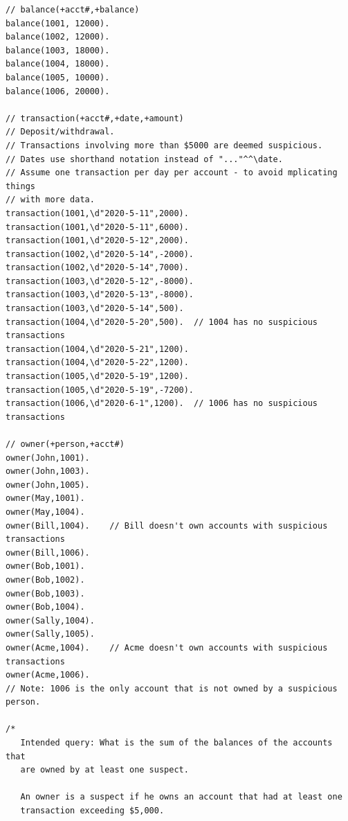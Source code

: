 \documentclass[11pt]{article}
\begin{document}
\begin{verbatim}
// balance(+acct#,+balance)
balance(1001, 12000).
balance(1002, 12000).
balance(1003, 18000).
balance(1004, 18000).
balance(1005, 10000).
balance(1006, 20000).

// transaction(+acct#,+date,+amount)
// Deposit/withdrawal.
// Transactions involving more than $5000 are deemed suspicious.
// Dates use shorthand notation instead of "..."^^\date.
// Assume one transaction per day per account - to avoid mplicating things
// with more data.
transaction(1001,\d"2020-5-11",2000).
transaction(1001,\d"2020-5-11",6000).
transaction(1001,\d"2020-5-12",2000).
transaction(1002,\d"2020-5-14",-2000).
transaction(1002,\d"2020-5-14",7000).
transaction(1003,\d"2020-5-12",-8000).
transaction(1003,\d"2020-5-13",-8000).
transaction(1003,\d"2020-5-14",500).
transaction(1004,\d"2020-5-20",500).  // 1004 has no suspicious transactions
transaction(1004,\d"2020-5-21",1200).
transaction(1004,\d"2020-5-22",1200).
transaction(1005,\d"2020-5-19",1200).
transaction(1005,\d"2020-5-19",-7200).
transaction(1006,\d"2020-6-1",1200).  // 1006 has no suspicious transactions

// owner(+person,+acct#)
owner(John,1001).
owner(John,1003).
owner(John,1005).
owner(May,1001).
owner(May,1004).
owner(Bill,1004).    // Bill doesn't own accounts with suspicious transactions
owner(Bill,1006).
owner(Bob,1001).
owner(Bob,1002).
owner(Bob,1003).
owner(Bob,1004).
owner(Sally,1004).
owner(Sally,1005).
owner(Acme,1004).    // Acme doesn't own accounts with suspicious transactions
owner(Acme,1006).
// Note: 1006 is the only account that is not owned by a suspicious person.

/*
   Intended query: What is the sum of the balances of the accounts that
   are owned by at least one suspect.

   An owner is a suspect if he owns an account that had at least one
   transaction exceeding $5,000.


\end{verbatim}
\end{document}
